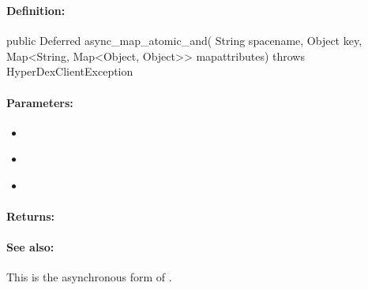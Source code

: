 \pagebreak
\subsubsection{}
\label{api:java:async_map_atomic_and}


\paragraph{Definition:}
\begin{javacode}
public Deferred async_map_atomic_and(
        String spacename,
        Object key,
        Map<String, Map<Object, Object>> mapattributes) throws HyperDexClientException
\end{javacode}

\paragraph{Parameters:}
\begin{itemize}[noitemsep]
\item {}\\

\item {}\\

\item {}\\

\end{itemize}

\paragraph{Returns:}


\paragraph{See also:}  This is the asynchronous form of .

\pagebreak
\subsubsection{}
\label{api:java:cond_map_atomic_and}


